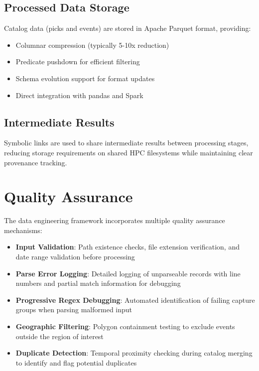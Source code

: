 \subsection{Processed Data Storage}
Catalog data (picks and events) are stored in Apache Parquet format, providing:
\begin{itemize}
  \item Columnar compression (typically 5-10x reduction)
  \item Predicate pushdown for efficient filtering
  \item Schema evolution support for format updates
  \item Direct integration with pandas and Spark
\end{itemize}

\subsection{Intermediate Results}
Symbolic links are used to share intermediate results between processing
stages, reducing storage requirements on shared HPC filesystems while
maintaining clear provenance tracking.

\section{Quality Assurance}

The data engineering framework incorporates multiple quality assurance
mechanisms:

\begin{itemize}
  \item \textbf{Input Validation}: Path existence checks, file extension
    verification, and date range validation before processing

  \item \textbf{Parse Error Logging}: Detailed logging of unparseable
    records with line numbers and partial match information for debugging

  \item \textbf{Progressive Regex Debugging}: Automated identification
    of failing capture groups when parsing malformed input

  \item \textbf{Geographic Filtering}: Polygon containment testing to
    exclude events outside the region of interest

  \item \textbf{Duplicate Detection}: Temporal proximity checking during
    catalog merging to identify and flag potential duplicates
\end{itemize}

